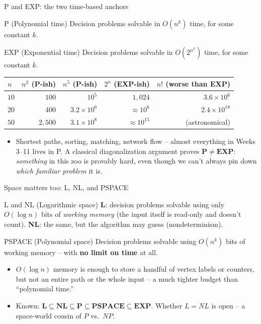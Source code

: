 \documentclass[11pt,aspectratio=169]{beamer}
\begin{document}
\begin{frame}{P and EXP: the two time-based anchors}
  \begin{block}{P (Polynomial time)}
    Decision problems solvable in $O(n^k)$ time, for some constant $k$.
  \end{block}
  \begin{block}{EXP (Exponential time)}
    Decision problems solvable in $O(2^{n^k})$ time, for some constant $k$.
  \end{block}
  \begin{center}
  \begin{tabular}{@{}lrrrr@{}}
    \toprule
    $n$ & $n^2$ (P-ish) & $n^5$ (P-ish) & $2^n$ (EXP-ish) & $n!$ (worse than EXP) \\
    \midrule
    $10$ & $100$ & $10^5$ & $1{,}024$ & $3.6\times 10^6$ \\
    $20$ & $400$ & $3.2\times10^6$ & $\approx 10^6$ & $2.4\times10^{18}$ \\
    $50$ & $2{,}500$ & $3.1\times10^8$ & $\approx 10^{15}$ & (astronomical) \\
    \bottomrule
  \end{tabular}
  \end{center}
  \begin{itemize}
    \item Shortest paths, sorting, matching, network flow -- almost everything in
    Weeks 3--11 lives in P. A classical diagonalization argument proves
    $\mathbf{P \ne EXP}$: \emph{something} in this zoo is provably hard, even though we
    can't always pin down \emph{which familiar problem} it is.
  \end{itemize}
\end{frame}

\begin{frame}{Space matters too: L, NL, and PSPACE}
  \begin{block}{L and NL (Logarithmic space)}
    \textbf{L}: decision problems solvable using only $O(\log n)$ bits of \emph{working
    memory} (the input itself is read-only and doesn't count). \textbf{NL}: the same,
    but the algorithm may guess (nondeterminism).
  \end{block}
  \begin{block}{PSPACE (Polynomial space)}
    Decision problems solvable using $O(n^k)$ bits of working memory -- with
    \textbf{no limit on time} at all.
  \end{block}
  \begin{itemize}
    \item $O(\log n)$ memory is enough to store a handful of vertex labels or counters,
    but not an entire path or the whole input -- a much tighter budget than
    ``polynomial time.''
    \item Known: $\mathbf{L \subseteq NL \subseteq P \subseteq PSPACE \subseteq EXP}$.
    Whether $L = NL$ is open -- a space-world cousin of $P$ vs.\ $NP$.
  \end{itemize}
\end{frame}
\end{document}
